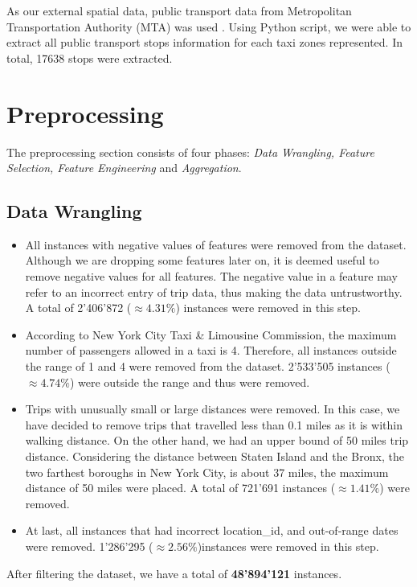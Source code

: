 \documentclass[11pt]{article}
\begin{document}
As our external spatial data, public transport data from Metropolitan Transportation Authority (MTA) was used \cite{mta_data}. Using Python script, we were able to extract all public transport stops information for each taxi zones represented. In total, 17638 stops were extracted.

\section{Preprocessing}

The preprocessing section consists of four phases: \textit{Data Wrangling, Feature Selection, Feature Engineering} and \textit{Aggregation}.

\subsection{Data Wrangling}

\begin{itemize}
  \item All instances with negative values of features were removed from the dataset. Although we are dropping some features later on, it is deemed useful to remove negative values for all features. The negative value in a feature may refer to an incorrect entry of trip data, thus making the data untrustworthy. A total of 2'406'872 ($\approx4.31\%$) instances were removed in this step.
  \item According to New York City Taxi \& Limousine Commission, the maximum number of passengers allowed in a taxi is 4. Therefore, all instances outside the range of 1 and 4 were removed from the dataset. 2'533'505 instances ($\approx4.74\%$) were outside the range and thus were removed.
  \item Trips with unusually small or large distances were removed. In this case, we have decided to remove trips that travelled less than 0.1 miles as it is within walking distance. On the other hand, we had an upper bound of 50 miles trip distance. Considering the distance between Staten Island and the Bronx, the two farthest boroughs in New York City, is about 37 miles, the maximum distance of 50 miles were placed. A total of 721'691 instances ($\approx1.41\%$) were removed.
  \item At last, all instances that had incorrect location\_id, and out-of-range dates were removed. 1'286'295 ($\approx2.56\%$)instances were removed in this step.
\end{itemize}

After filtering the dataset, we have a total of \textbf{48'894'121} instances. 
\end{document}
